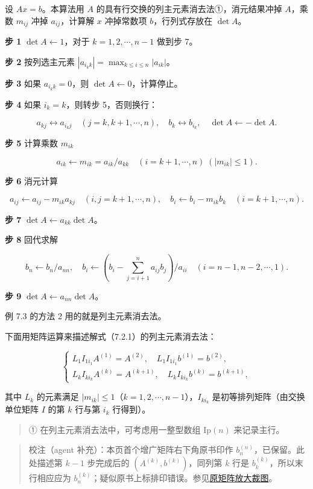 \documentclass[
  10pt,
  fontset=fandol]{ctexart}
\begin{document}
设 \(Ax=b\)。本算法用 \(A\) 的具有行交换的列主元素消去法①，消元结果冲掉 \(A\)，乘数 \(m_{ij}\) 冲掉 \(a_{ij}\)，计算解 \(x\) 冲掉常数项 \(b\)，行列式存放在 \(\det A\)。

\textbf{步 1} \(\det A\leftarrow1\)，对于 \(k=1,2,\cdots,n-1\) 做到步 7。

\textbf{步 2} 按列选主元素 \(|a_{i_kk}|=\max_{k\le i\le n}|a_{ik}|\)。

\textbf{步 3} 如果 \(a_{i_kk}=0\)，则 \(\det A\leftarrow0\)，计算停止。

\textbf{步 4} 如果 \(i_k=k\)，则转步 5，否则换行：

\[a_{kj}\leftrightarrow a_{i_kj}\quad(j=k,k+1,\cdots,n),\quad b_k\leftrightarrow b_{i_k},\quad \det A\leftarrow-\det A.\]

\textbf{步 5} 计算乘数 \(m_{ik}\)

\[a_{ik}\leftarrow m_{ik}=a_{ik}/a_{kk}\quad(i=k+1,\cdots,n)\;(|m_{ik}|\le1).\]

\textbf{步 6} 消元计算

\[a_{ij}\leftarrow a_{ij}-m_{ik}a_{kj}\quad(i,j=k+1,\cdots,n),\quad b_i\leftarrow b_i-m_{ik}b_k\quad(i=k+1,\cdots,n).\]

\textbf{步 7} \(\det A\leftarrow a_{kk}\det A\)。

\textbf{步 8} 回代求解

\[b_n\leftarrow b_n/a_{nn},\quad b_i\leftarrow\left(b_i-\sum_{j=i+1}^{n}a_{ij}b_j\right)/a_{ii}\quad(i=n-1,n-2,\cdots,1).\]

\textbf{步 9} \(\det A\leftarrow a_{nn}\det A\)。

例 7.3 的方法 2 用的就是列主元素消去法。

下面用矩阵运算来描述解式（7.2.1）的列主元素消去法：

\[
\begin{cases}
L_1I_{1i_1}A^{(1)}=A^{(2)},\quad L_1I_{1i_1}b^{(1)}=b^{(2)},\\
L_kI_{ki_k}A^{(k)}=A^{(k+1)},\quad L_kI_{ki_k}b^{(k)}=b^{(k+1)},
\end{cases}
\tag{7.3.1}
\]

其中 \(L_k\) 的元素满足 \(|m_{ik}|\le1\)（\(k=1,2,\cdots,n-1\)），\(I_{ki_k}\) 是初等排列矩阵（由交换单位矩阵 \(I\) 的第 \(k\) 行与第 \(i_k\) 行得到）。

\begin{quote}
① 在列主元素消去法中，可考虑用一整型数组 \(\mathrm{Ip}(n)\) 来记录主行。
\end{quote}

\begin{quote}
校注（agent 补充）：本页首个增广矩阵右下角原书印作 \(b_n^{(n)}\)，已保留。此处描述第 \(k-1\) 步完成后的 \((A^{(k)},b^{(k)})\)，同列第 \(k\) 行是 \(b_k^{(k)}\)，所以末行相应应为 \(b_n^{(k)}\)；疑似原书上标排印错误。参见\href{../assets/ch07a/pdf-187-rhs-detail.png}{原矩阵放大裁图}。
\end{quote}
\end{document}
